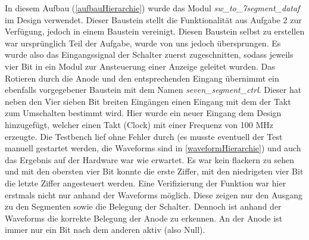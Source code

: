\documentclass[11pt, a4paper]{article}
\begin{document}
In diesem Aufbau (\autoref{aufbauHierarchie}) wurde das Modul \textit{sw\_to\_7segment\_dataf} im Design verwendet. Dieser Baustein stellt die Funktionalität aus Aufgabe 2 zur Verfügung, jedoch in einem Baustein vereinigt. Diesen Baustein selbst zu erstellen war ursprünglich Teil der Aufgabe, wurde von uns jedoch übersprungen. Es wurde also das Eingangssignal der Schalter zuerst zugeschnitten, sodass jeweils vier Bit in ein Modul zur Ansteuerung einer Anzeige geleitet wurden. Das Rotieren durch die Anode und den entsprechenden Eingang übernimmt ein ebenfalls vorgegebener Baustein mit dem Namen \textit{seven\_segment\_ctrl}. Dieser hat neben den Vier sieben Bit breiten Eingängen einen Eingang mit dem der Takt zum Umschalten bestimmt wird. Hier wurde ein neuer Eingang dem Design hinzugefügt, welcher einen Takt (Clock) mit einer Frequenz von 100 MHz erzeugte.
Die Testbench lief ohne Fehler durch (es musste eventuell der Test manuell gestartet werden, die Waveforms sind in \autoref{waveformHierarchie}) und auch das Ergebnis auf der Hardware war wie erwartet. Es war kein flackern zu sehen und mit den obersten vier Bit konnte die erste Ziffer, mit den niedrigsten vier Bit die letzte Ziffer angesteuert werden. Eine Verifizierung der Funktion war hier erstmals nicht nur anhand der Waveforms möglich. Diese zeigen nur den Ausgang zu den Segmenten sowie die Belegung der Schalter. Dennoch ist anhand der Waveforms die korrekte Belegung der Anode zu erkennen. An der Anode ist immer nur ein Bit nach dem anderen aktiv (also Null).
\end{document}
